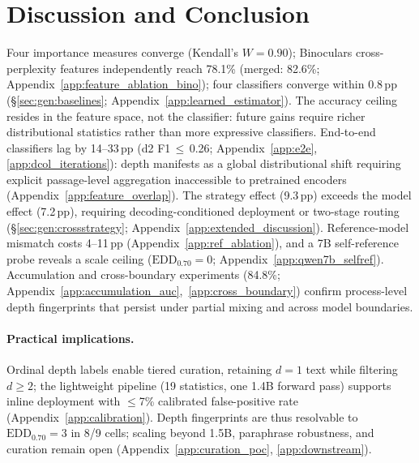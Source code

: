 \section{Discussion and Conclusion}
\label{sec:discussion}

Four importance measures converge (Kendall's $W{=}0.90$); Binoculars cross-perplexity features independently reach 78.1\% (merged: 82.6\%; Appendix~\ref{app:feature_ablation_bino}); four classifiers converge within 0.8\,pp (\S\ref{sec:gen:baselines}; Appendix~\ref{app:learned_estimator}).
The accuracy ceiling resides in the feature space, not the classifier: future gains require richer distributional statistics rather than more expressive classifiers.
End-to-end classifiers lag by 14--33\,pp (d2 F1\,${\leq}$\,0.26; Appendix~\ref{app:e2e}, \ref{app:dcol_iterations}): depth manifests as a global distributional shift requiring explicit passage-level aggregation inaccessible to pretrained encoders (Appendix~\ref{app:feature_overlap}).
The strategy effect (9.3\,pp) exceeds the model effect (7.2\,pp), requiring decoding-conditioned deployment or two-stage routing (\S\ref{sec:gen:crossstrategy}; Appendix~\ref{app:extended_discussion}).
Reference-model mismatch costs 4--11\,pp (Appendix~\ref{app:ref_ablation}), and a 7B self-reference probe reveals a scale ceiling ($\mathrm{EDD}_{0.70}{=}0$; Appendix~\ref{app:qwen7b_selfref}).
Accumulation and cross-boundary experiments (84.8\%; Appendix~\ref{app:accumulation_auc},~\ref{app:cross_boundary}) confirm process-level depth fingerprints that persist under partial mixing and across model boundaries.

\paragraph{Practical implications.}
Ordinal depth labels enable tiered curation, retaining $d{=}1$ text while filtering $d{\geq}2$; the lightweight pipeline (19 statistics, one 1.4B forward pass) supports inline deployment with ${\leq}$7\% calibrated false-positive rate (Appendix~\ref{app:calibration}).
Depth fingerprints are thus resolvable to $\mathrm{EDD}_{0.70}{=}3$ in 8/9 cells; scaling beyond 1.5B, paraphrase robustness, and curation remain open (Appendix~\ref{app:curation_poc}, \ref{app:downstream}).
